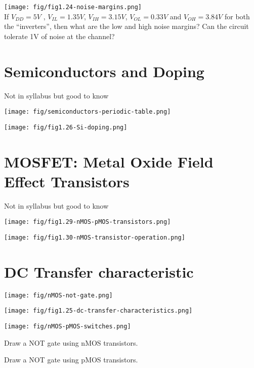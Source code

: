 \begin{example}
  \texttt{[image: fig/fig1.24-noise-margins.png]}\\
  If $V_{DD} = 5V$ , $V_{IL} = 1.35V$, $V_{IH} = 3.15V$, $V_{OL} = 0.33V$ and
  $V_{OH} = 3.84V$ for both the ``inverters'', then what are the low and high
  noise margins? Can the circuit tolerate 1V of noise at the channel?
\end{example}
\vspace{10em}

\section{Semiconductors and Doping}
{\tiny{Not in syllabus but good to know}}

\texttt{[image: fig/semiconductors-periodic-table.png]}


\texttt{[image: fig/fig1.26-Si-doping.png]}

\section{MOSFET: Metal Oxide Field Effect Transistors }
{\tiny{Not in syllabus but good to know}}

\texttt{[image: fig/fig1.29-nMOS-pMOS-transistors.png]}

\texttt{[image: fig/fig1.30-nMOS-transistor-operation.png]}

\section{DC Transfer characteristic}

\texttt{[image: fig/nMOS-not-gate.png]}

\texttt{[image: fig/fig1.25-dc-transfer-characteristics.png]}

\texttt{[image: fig/nMOS-pMOS-switches.png]}


\begin{example}
  Draw a NOT gate using nMOS transistors.
\end{example}
\vspace{10em}

\begin{example}
  Draw a NOT gate using pMOS transistors.
\end{example}
\vspace{10em}

